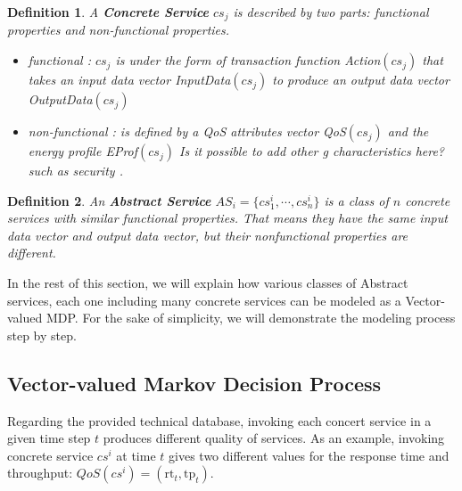 \documentclass[10pt,journal,compsoc]{IEEEtran}
\newtheorem{definition}{Definition}
\begin{document}
\begin{definition}
A \textbf{Concrete Service} $cs_j$ is described by two parts: functional properties and non-functional properties.
\begin{itemize}
\item functional : $cs_j$ is under the form of transaction function Action$(cs_j)$ that takes an input data vector InputData$(cs_j)$ to produce an output data vector OutputData$(cs_j)$ 
\item non-functional : is defined by a QoS attributes vector QoS$(cs_j)$ and the energy profile EProf$(cs_j)$ {\color{red} Is it possible to add other g
characteristics here? such as security }.  
\end{itemize}
\end{definition}

\begin{definition}
An \textbf{Abstract Service} $AS_i = \{ cs_1^i, \cdots, cs_n^i \}$ is a class of $n$ concrete services with similar functional properties. That means they have the same input data vector and output data vector, but their nonfunctional properties are different. 
\end{definition}

In the rest of this section, we will explain how various classes of Abstract services, each one including many concrete services can be modeled as a Vector-valued MDP. For the sake of simplicity, we will demonstrate the modeling process step by step. 



\subsection{Vector-valued Markov Decision Process}


Regarding the provided technical database, invoking each concert service in a given time step $t$ produces different quality of services. As an example, invoking concrete service $cs^i$ at time $t$ gives two different values for the response time and throughput: $QoS(cs^i) = (\text{rt}_t, \text{tp}_t)$. 
\end{document}
